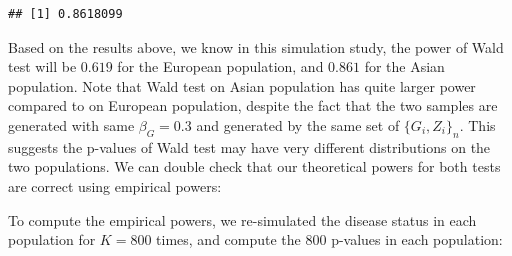 \documentclass[
]{article}
\newenvironment{Shaded}{\begin{snugshade}}{\end{snugshade}}
\newcommand{\CommentTok}[1]{\textcolor[rgb]{0.56,0.35,0.01}{\textit{#1}}}
\newcommand{\ControlFlowTok}[1]{\textcolor[rgb]{0.13,0.29,0.53}{\textbf{#1}}}
\newcommand{\DataTypeTok}[1]{\textcolor[rgb]{0.13,0.29,0.53}{#1}}
\newcommand{\DecValTok}[1]{\textcolor[rgb]{0.00,0.00,0.81}{#1}}
\newcommand{\FloatTok}[1]{\textcolor[rgb]{0.00,0.00,0.81}{#1}}
\newcommand{\KeywordTok}[1]{\textcolor[rgb]{0.13,0.29,0.53}{\textbf{#1}}}
\newcommand{\NormalTok}[1]{#1}
\newcommand{\OperatorTok}[1]{\textcolor[rgb]{0.81,0.36,0.00}{\textbf{#1}}}
\newcommand{\StringTok}[1]{\textcolor[rgb]{0.31,0.60,0.02}{#1}}
\begin{document}
\begin{verbatim}
## [1] 0.8618099
\end{verbatim}

Based on the results above, we know in this simulation study, the power
of Wald test will be \(0.619\) for the European population, and
\(0.861\) for the Asian population. Note that Wald test on Asian
population has quite larger power compared to on European population,
despite the fact that the two samples are generated with same
\(\beta_G = 0.3\) and generated by the same set of \(\{G_i,Z_i\}_n\).
This suggests the p-values of Wald test may have very different
distributions on the two populations. We can double check that our
theoretical powers for both tests are correct using empirical powers:

To compute the empirical powers, we re-simulated the disease status in
each population for \(K = 800\) times, and compute the \(800\) p-values
in each population:

\begin{Shaded}
\end{Shaded}
\end{document}
